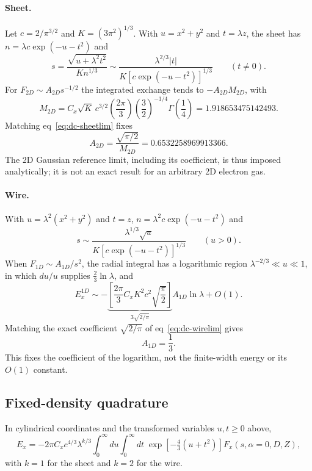 \documentclass[journal=jctcce,manuscript=article]{achemso}
\begin{document}
\paragraph{Sheet.}  Let $c=2/\pi^{3/2}$ and $K=(3\pi^2)^{1/3}$.  With
$u=x^2+y^2$ and $t=\lambda z$, the sheet has $n=\lambda c\exp(-u-t^2)$ and
\begin{equation}
s=\frac{\sqrt{u+\lambda^2t^2}}{Kn^{1/3}}\sim
\frac{\lambda^{2/3}|t|}{K[c\exp(-u-t^2)]^{1/3}}\qquad(t\ne0).
\label{eq:dc-ssheet}
\end{equation}
For $F_{2D}\sim A_{2D}s^{-1/2}$ the integrated exchange tends to
$-A_{2D}M_{2D}$, with
\begin{equation}
M_{2D}=C_x\sqrt K\,c^{3/2}\left(\frac{2\pi}{3}\right)
\left(\frac32\right)^{-1/4}\Gamma\!\left(\frac14\right)=1.918653475142493.
\label{eq:dc-M2D}
\end{equation}
Matching eq~\ref{eq:dc-sheetlim} fixes
\begin{equation}
A_{2D}=\frac{\sqrt{\pi/2}}{M_{2D}}=0.6532258969913366.
\label{eq:dc-A2D}
\end{equation}
The 2D Gaussian reference limit, including its coefficient, is thus imposed
analytically; it is not an exact result for an arbitrary 2D electron gas.

\paragraph{Wire.}  With $u=\lambda^2(x^2+y^2)$ and $t=z$,
$n=\lambda^2c\exp(-u-t^2)$ and
\begin{equation}
s\sim\frac{\lambda^{1/3}\sqrt u}{K[c\exp(-u-t^2)]^{1/3}}\qquad(u>0).
\label{eq:dc-swire}
\end{equation}
When $F_{1D}\sim A_{1D}/s^2$, the radial integral has a logarithmic region
$\lambda^{-2/3}\ll u\ll1$, in which $du/u$ supplies $\tfrac23\ln\lambda$, and
\begin{equation}
E_x^{1D}\sim-\underbrace{\left[\frac{2\pi}{3}C_xK^2c^2\sqrt{\frac{\pi}{2}}\right]}_{3\sqrt{2/\pi}}
A_{1D}\ln\lambda+O(1).
\label{eq:dc-E1D}
\end{equation}
Matching the exact coefficient $\sqrt{2/\pi}$ of eq~\ref{eq:dc-wirelim} gives
\begin{equation}
A_{1D}=\frac13.
\label{eq:dc-A1D}
\end{equation}
This fixes the coefficient of the logarithm, not the finite-width energy or
its $O(1)$ constant.

\subsection{Fixed-density quadrature}
In cylindrical coordinates and the transformed variables $u,t\ge0$ above,
\begin{equation}
E_x=-2\pi C_xc^{4/3}\lambda^{k/3}\int_0^\infty du\int_0^\infty dt\;
\exp\!\left[-\tfrac43(u+t^2)\right]F_x(s,\alpha=0,D,Z),
\label{eq:dc-quad}
\end{equation}
with $k=1$ for the sheet and $k=2$ for the wire.
\end{document}
